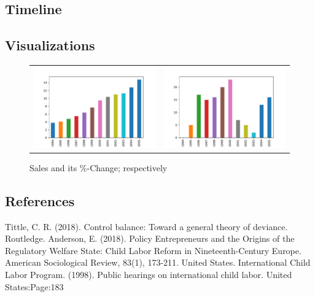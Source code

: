\documentclass[11pt, a4paper, margin=1in]{IEEEtran}
\begin{document}
\subsection{Timeline}

\subsection{Visualizations}

\begin{figure}[h]
   \centering
   \begin{tabular}{c c}
       \includegraphics[page=1,width=.6\textwidth]{fig.pdf} & 
       \includegraphics[page=1,width=.6\textwidth]{fig2.pdf} \\
   \end{tabular}
 \caption{Sales and its \%-Change; respectively}
 \label{fig:Test}
\end{figure}

%
%

\subsection{References}
\begin{thebibliography}{9}
    Tittle, C. R. (2018). Control balance: Toward a general theory of deviance. Routledge.
    Anderson, E. (2018). Policy Entrepreneurs and the Origins of the Regulatory Welfare State: Child Labor Reform in Nineteenth-Century Europe. American Sociological Review, 83(1), 173-211.
    United States. International Child Labor Program. (1998). Public hearings on international child labor. United States:Page:183
\end{thebibliography}
\end{document}
